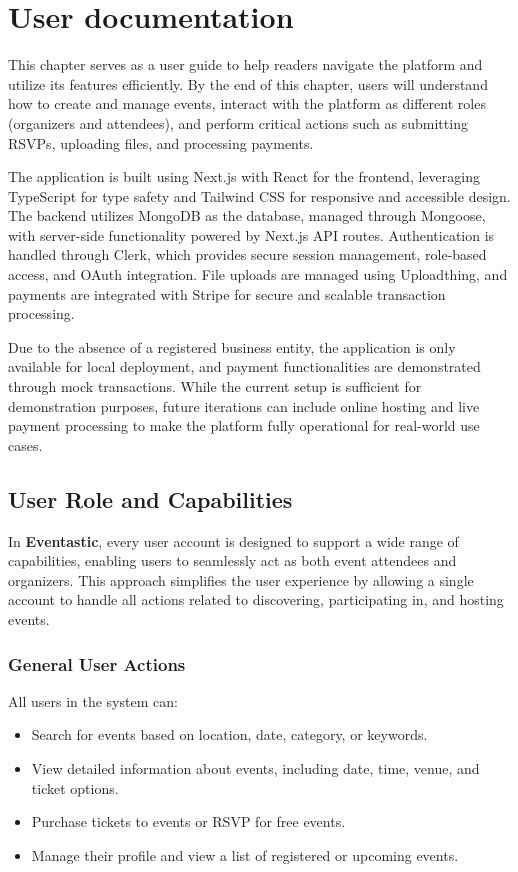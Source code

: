 \chapter{User documentation}
\label{ch:user}

This chapter serves as a user guide to help readers navigate the platform and utilize its features efficiently. By the end of this chapter, users will understand how to create and manage events, interact with the platform as different roles (organizers and attendees), and perform critical actions such as submitting RSVPs, uploading files, and processing payments.

The application is built using Next.js\cite{nextjs} with React\cite{react} for the frontend, leveraging TypeScript\cite{typescript} for type safety and Tailwind CSS\cite{tailwindcss} for responsive and accessible design. The backend utilizes MongoDB\cite{mongodb} as the database, managed through Mongoose\cite{mongoose}, with server-side functionality powered by Next.js API routes. Authentication is handled through Clerk\cite{clerk}, which provides secure session management, role-based access, and OAuth integration. File uploads are managed using Uploadthing\cite{uploadthing}, and payments are integrated with Stripe\cite{stripe} for secure and scalable transaction processing.

Due to the absence of a registered business entity, the application is only available for local deployment, and payment functionalities are demonstrated through mock transactions. While the current setup is sufficient for demonstration purposes, future iterations can include online hosting and live payment processing to make the platform fully operational for real-world use cases.


\section{User Role and Capabilities}
In \textbf{Eventastic}, every user account is designed to support a wide range of capabilities, enabling users to seamlessly act as both event attendees and organizers. This approach simplifies the user experience by allowing a single account to handle all actions related to discovering, participating in, and hosting events.

\subsection{General User Actions}
All users in the system can:
\begin{itemize}
    \item Search for events based on location, date, category, or keywords.
    \item View detailed information about events, including date, time, venue, and ticket options.
    \item Purchase tickets to events or RSVP for free events.
    \item Manage their profile and view a list of registered or upcoming events.
\end{itemize}


